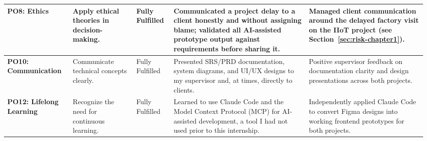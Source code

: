 \begin{longtable}[H]{|p{2.5cm}|p{3.5cm}|p{2cm}|p{4cm}|p{4cm}|}
\textbf{PO8: Ethics} & Apply ethical theories in decision-making. & Fully Fulfilled & Communicated a project delay to a client honestly and without assigning blame; validated all AI-assisted prototype output against requirements before sharing it. & Managed client communication around the delayed factory visit on the IIoT project (see Section~\ref{sec:risk-chapter1}). \\
\hline

\textbf{PO10: Communication} & Communicate technical concepts clearly. & Fully Fulfilled & Presented SRS/PRD documentation, system diagrams, and UI/UX designs to my supervisor and, at times, directly to clients. & Positive supervisor feedback on documentation clarity and design presentations across both projects. \\
\hline

\textbf{PO12: Lifelong Learning} & Recognize the need for continuous learning. & Fully Fulfilled & Learned to use Claude Code and the Model Context Protocol (MCP) for AI-assisted development, a tool I had not used prior to this internship. & Independently applied Claude Code to convert Figma designs into working frontend prototypes for both projects. \\
\end{longtable}

